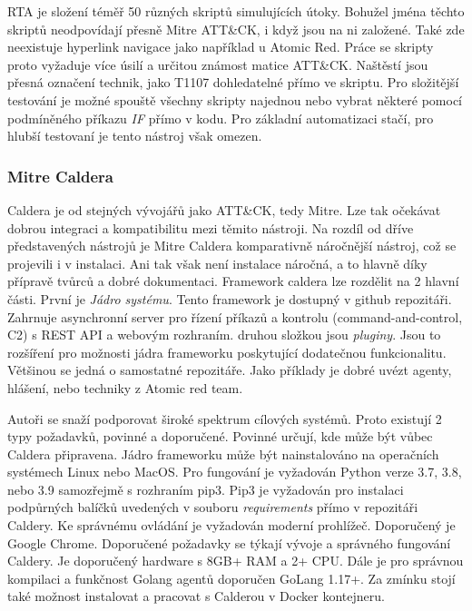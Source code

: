 \ac{RTA} je složení téměř 50 různých skriptů simulujících útoky.
Bohužel jména těchto skriptů neodpovídají přesně Mitre ATT\&CK, i když jsou na ni založené.
Také zde neexistuje hyperlink navigace jako například u Atomic Red.
Práce se skripty proto vyžaduje více úsilí a určitou známost matice ATT\&CK\@.
Naštěstí jsou přesná označení technik, jako T1107 dohledatelné přímo ve skriptu.
Pro složitější testování je možné spouště všechny skripty najednou nebo vybrat některé pomocí podmíněného příkazu \textit{IF} přímo v kodu.
Pro základní automatizaci stačí, pro hlubší testovaní je tento nástroj však omezen.\cite{csoonline_4_testing_frameworks}



\subsubsection{Mitre Caldera}
Caldera je od stejných vývojářů jako ATT\&CK, tedy Mitre.
Lze tak očekávat dobrou integraci a kompatibilitu mezi těmito nástroji.
Na rozdíl od dříve představených nástrojů je Mitre Caldera komparativně náročnější nástroj, což se projevili i v instalaci.
Ani tak však není instalace náročná, a to hlavně díky přípravě tvůrců a dobré dokumentaci\cite{mitre_caldera_docs}.
Framework caldera lze rozdělit na 2 hlavní části.
První je \textit{Jádro systému}.
Tento framework je dostupný v github repozitáři.
Zahrnuje asynchronní server pro řízení příkazů a kontrolu (command-and-control, C2) s REST API a webovým rozhraním.
druhou složkou jsou \textit{pluginy}.
Jsou to rozšíření pro možnosti jádra frameworku poskytující dodatečnou funkcionalitu.
Většinou se jedná o samostatné repozitáře.
Jako příklady je dobré uvézt agenty, hlášení, nebo  techniky z Atomic red team.\cite{mitre_caldera}

Autoři se snaží podporovat široké spektrum cílových systémů.
Proto existují 2 typy požadavků, povinné a doporučené.
Povinné určují, kde může být vůbec Caldera připravena.
Jádro frameworku může být nainstalováno na operačních systémech Linux nebo MacOS.
Pro fungování je vyžadován Python verze 3.7, 3.8, nebo 3.9 samozřejmě s rozhraním pip3.
Pip3 je vyžadován pro instalaci podpůrných balíčků uvedených v souboru \textit{requirements} přímo v repozitáři Caldery.
Ke správnému ovládání je vyžadován moderní prohlížeč.
Doporučený je Google Chrome.
Doporučené požadavky se týkají vývoje a správného fungování Caldery.
Je doporučený hardware s 8GB+ RAM a 2+ CPU\@.
Dále je pro správnou kompilaci a funkčnost Golang agentů doporučen GoLang 1.17+.
Za zmínku stojí také možnost instalovat a pracovat s Calderou v Docker kontejneru.\cite{mitre_caldera_docs}

